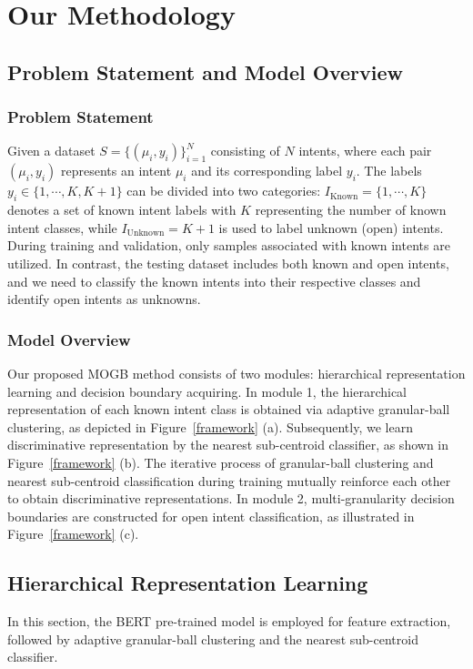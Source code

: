 \documentclass[letterpaper]{article} %
\theoremstyle{definition}
\begin{document}
\section{Our Methodology}\label{sec:4}
\subsection{Problem Statement and Model Overview}

\subsubsection{Problem Statement}
Given a dataset $S=\{(\mu_i, y_i)\}_{i=1}^{N}$ consisting of $N$ intents, where each pair $(\mu_i, y_i)$ represents an intent $\mu_i$ and its corresponding label $y_i$. The labels $y_i \in \{1,\cdots, K, K+1\}$ can be divided into two categories: $I_{\text{Known}}=\{1,\cdots, K\}$ denotes a set of known intent labels with $K$ representing the number of known intent classes, while $I_{\text{Unknown}}=K+1$ is used to label unknown (open) intents. During training and validation, only samples associated with known intents are utilized. In contrast, the testing dataset includes both known and open intents, and we need to classify the known intents into their respective classes and identify open intents as unknowns.
\subsubsection{Model Overview}
Our proposed MOGB method consists of two modules: hierarchical representation learning and decision boundary acquiring. In module 1, the hierarchical representation of each known intent class is obtained via adaptive granular-ball clustering, as depicted in Figure~\ref{framework} (a). Subsequently, we learn discriminative representation by the nearest sub-centroid classifier, as shown in Figure~\ref{framework} (b).
The iterative process of granular-ball clustering and nearest sub-centroid classification during training mutually reinforce each other to obtain discriminative representations. 
In module 2, multi-granularity decision boundaries are constructed for open intent classification, as illustrated in Figure~\ref{framework} (c).

\subsection{Hierarchical Representation Learning}
In this section, the BERT pre-trained model is employed for feature extraction, followed by adaptive granular-ball clustering and the nearest sub-centroid classifier.
\end{document}
